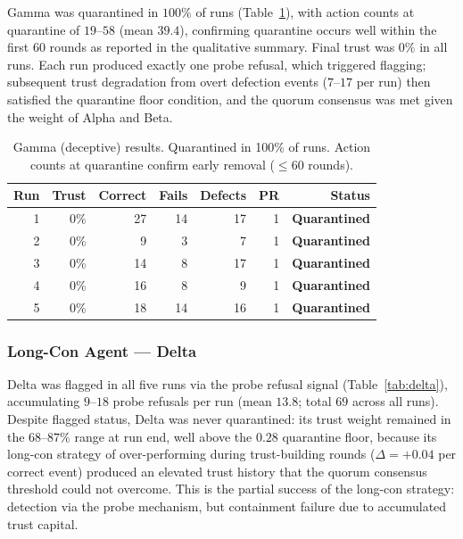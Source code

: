 Gamma was quarantined in $100\%$ of runs (Table~\ref{tab:gamma}), with action counts at quarantine of
$19$--$58$ (mean $39.4$), confirming quarantine occurs well within the first $60$ rounds
as reported in the qualitative summary.  Final trust was $0\%$ in all runs.  Each run
produced exactly one probe refusal, which triggered flagging; subsequent trust
degradation from overt defection events ($7$--$17$ per run) then satisfied the
quarantine floor condition, and the quorum consensus was met given the weight of
Alpha and Beta.

\begin{table}[h]
\centering
\caption{Gamma (deceptive) results. Quarantined in 100\% of runs. Action counts
         at quarantine confirm early removal ($\leq 60$ rounds).}
\label{tab:gamma}
\begin{tabular}{rrrrrrr}
\hline
\textbf{Run} & \textbf{Trust} & \textbf{Correct} & \textbf{Fails} &
\textbf{Defects} & \textbf{PR} & \textbf{Status} \\
\hline
1 & 0\% & 27 & 14 & 17 & 1 & \textbf{Quarantined} \\
2 & 0\% &  9 &  3 &  7 & 1 & \textbf{Quarantined} \\
3 & 0\% & 14 &  8 & 17 & 1 & \textbf{Quarantined} \\
4 & 0\% & 16 &  8 &  9 & 1 & \textbf{Quarantined} \\
5 & 0\% & 18 & 14 & 16 & 1 & \textbf{Quarantined} \\
\hline
\end{tabular}
\end{table}

\subsubsection{Long-Con Agent — Delta}

Delta was flagged in all five runs via the probe refusal signal (Table~\ref{tab:delta}), accumulating $9$--$18$
probe refusals per run (mean $13.8$; total $69$ across all runs).  Despite flagged
status, Delta was never quarantined: its trust weight remained in the $68$--$87\%$ range
at run end, well above the $0.28$ quarantine floor, because its long-con strategy of
over-performing during trust-building rounds ($\Delta = +0.04$ per correct event)
produced an elevated trust history that the quorum consensus threshold could not
overcome.  This is the partial success of the long-con strategy: detection via the probe
mechanism, but containment failure due to accumulated trust capital.

